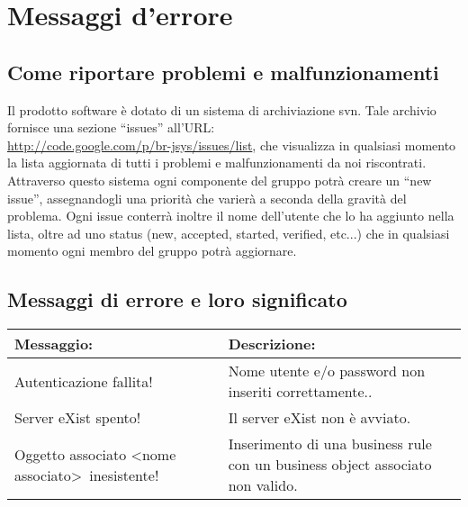 \chapter{Messaggi d'errore}
\section{Come riportare problemi e malfunzionamenti}
Il prodotto software \`e dotato di un sistema di archiviazione svn. Tale archivio fornisce una sezione ``issues'' all'URL: \\ 
\href{http://code.google.com/p/br-jsys/issues/list}{http://code.google.com/p/br-jsys/issues/list}, che visualizza in qualsiasi momento la lista aggiornata di tutti i problemi e malfunzionamenti da noi riscontrati. Attraverso questo sistema ogni componente del gruppo potr\`a creare un ``new issue'', assegnandogli una priorit\`a che varier\`a a seconda della gravit\`a del problema. Ogni issue conterr\`a inoltre il nome dell'utente che lo ha aggiunto nella lista, oltre ad uno status (new, accepted, started, verified, etc...) che in qualsiasi momento ogni membro del gruppo potr\`a aggiornare. 


\section{Messaggi di errore e loro significato}
\begin{table}[htbp]
\begin{tabular}{|p{6.5cm}|p{6.5cm}|}
\hline
\textbf{Messaggio:} & \textbf{Descrizione:} \\ \hline
Autenticazione fallita! & Nome utente e/o password non inseriti correttamente..\\ \hline
Server eXist spento! & Il server eXist non \`e avviato. \\ \hline
Oggetto associato \textless nome associato\textgreater\ inesistente! & Inserimento di una business rule con un business object associato non valido. \\ \hline
\end{tabular} \\
\end{table}

